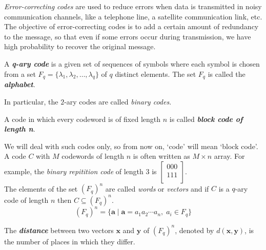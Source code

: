 \documentclass[../main.tex]{subfiles}
\begin{document}
\emph{Error-correcting codes} are used to reduce errors when data is transmitted in noisy communication channels, like a telephone line, a satellite communication link, etc.
The objective of error-correcting codes is to add a certain amount of redundancy to the message, so that even if some errors occur during transmission, we have high probability to recover the original message.

\begin{defn}
	A \textbf{\emph{q-ary code}} is a given set of sequences of symbols where each symbol is chosen from a set $F_q = \{\lambda_1, \lambda_2, \ldots ,\lambda_q\}$ of $q$ distinct elements. The set $F_q$ is called the \textbf{\emph{alphabet}}. 
\end{defn}
In particular, the $2$-ary codes are called \emph{binary codes}.

\begin{defn}
	A code in which every codeword is of fixed length $n$ is called \textbf{\emph{block code of length n}}.
\end{defn}
We will deal with such codes only, so from now on, `code' will mean `block code'. A code $C$ with $M$ codewords of length $n$ is often written as $M\times n$ array. For example, the \emph{binary repitition code} of length 3 is
\(
	\begin{bmatrix}
		0 0 0\\
		1 1 1\\
	\end{bmatrix}
\).\\
The elements of the set $(F_q)^n$ are called \emph{words} or \emph{vectors} and if $C$ is a $q$-ary code of length $n$ then $C\subseteq (F_q)^n$.  
\[
	(F_q)^n = \{\textbf{a}\; | \; \textbf{a} = a_1a_2\cdots a_n,\;a_i\in F_q\}  
\]
 
\begin{defn}
	The \textbf{\emph{distance}} between two vectors $\textbf{x}$ and $\textbf{y}$ of $(F_q)^n$, denoted by $d(\textbf{x},\textbf{y})$, is the number of places in which they differ.
\end{defn}
\end{document}
